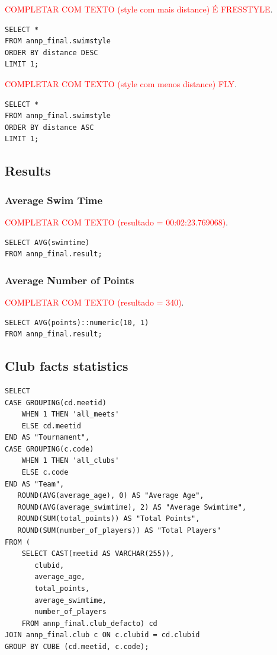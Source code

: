 \textcolor{red}{COMPLETAR COM TEXTO (style com mais distance) É FRESSTYLE}.

\begin{verbatim}
SELECT *
FROM annp_final.swimstyle
ORDER BY distance DESC
LIMIT 1;
\end{verbatim}

\textcolor{red}{COMPLETAR COM TEXTO (style com menos distance) FLY}.

\begin{verbatim}
SELECT *
FROM annp_final.swimstyle
ORDER BY distance ASC
LIMIT 1;
\end{verbatim}

\subsection{Results}

\subsubsection{Average Swim Time}

\textcolor{red}{COMPLETAR COM TEXTO (resultado = 00:02:23.769068)}.

\begin{verbatim}
SELECT AVG(swimtime)
FROM annp_final.result;
\end{verbatim}

\subsubsection{Average Number of Points}

\textcolor{red}{COMPLETAR COM TEXTO (resultado = 340)}.
\begin{verbatim}
SELECT AVG(points)::numeric(10, 1)
FROM annp_final.result;
\end{verbatim}

\subsection{Club facts statistics}

\begin{verbatim}
SELECT 
CASE GROUPING(cd.meetid)
    WHEN 1 THEN 'all_meets'
    ELSE cd.meetid
END AS "Tournament",
CASE GROUPING(c.code)
    WHEN 1 THEN 'all_clubs'
    ELSE c.code
END AS "Team",
   ROUND(AVG(average_age), 0) AS "Average Age",
   ROUND(AVG(average_swimtime), 2) AS "Average Swimtime",
   ROUND(SUM(total_points)) AS "Total Points",
   ROUND(SUM(number_of_players)) AS "Total Players"
FROM (
    SELECT CAST(meetid AS VARCHAR(255)),
       clubid,
       average_age,
       total_points,
       average_swimtime,
       number_of_players
    FROM annp_final.club_defacto) cd
JOIN annp_final.club c ON c.clubid = cd.clubid
GROUP BY CUBE (cd.meetid, c.code);
\end{verbatim}


